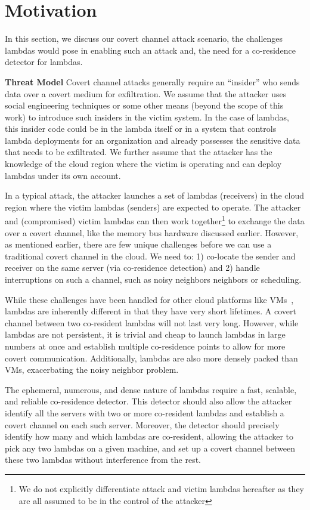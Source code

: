 
\section{Motivation}
\label{sec:motivation}

In this section, we discuss our covert channel attack scenario, the challenges
lambdas would pose in enabling such an attack and, the need for a co-residence
detector for lambdas.

\textbf{Threat Model}
Covert channel attacks generally require an ``insider'' who sends data over a
covert medium for exfiltration. We assume that the attacker uses social
engineering techniques or some other means (beyond the scope of this work) to
introduce  such insiders in the victim system. In the case of lambdas, this
insider code could be in the lambda itself or in a system that controls lambda
deployments for an organization and already possesses the sensitive data that
needs to be exfiltrated.  We further assume that the attacker has the knowledge
of the cloud region where the victim is operating and can deploy lambdas under
its own account.

In a typical attack, the attacker launches a set of lambdas (receivers) in the
cloud region where the victim lambdas (senders) are expected to operate. The
attacker and (compromised) victim lambdas can then work together\footnote{We
do not explicitly differentiate attack and victim lambdas hereafter as they are
all assumed to be in the control of the attacker} to exchange the data over a covert
channel, like the memory bus hardware discussed earlier.  However, as
mentioned earlier, there are few unique challenges before we can use a
traditional covert channel in the cloud. We need to: 1) co-locate the sender and
receiver on the same server (via co-residence detection) and 2)
handle interruptions on such a channel, such as noisy neighbors
neighbors or scheduling.

While these challenges have been handled for other cloud platforms like 
VMs~\cite{varad191016,wuusenix2012}, lambdas are inherently different in that they have very short
lifetimes. A covert channel between two co-resident lambdas will not last very
long. However, while lambdas are not persistent, it is trivial and cheap to
launch lambdas in large numbers at once and establish multiple co-residence
points to allow for more covert communication.  Additionally, lambdas are also
more densely packed than VMs, exacerbating the noisy neighbor problem.

The ephemeral, numerous, and dense nature of lambdas require a fast, scalable,
and reliable co-residence detector. This detector should also allow the attacker
identify all the servers with two or more co-resident lambdas and establish a
covert channel on each such server. Moreover, the detector should precisely
identify how many and which lambdas are co-resident, allowing the attacker to
pick any two lambdas on a given machine, and set up a covert channel between
these two lambdas without interference from the rest. 


